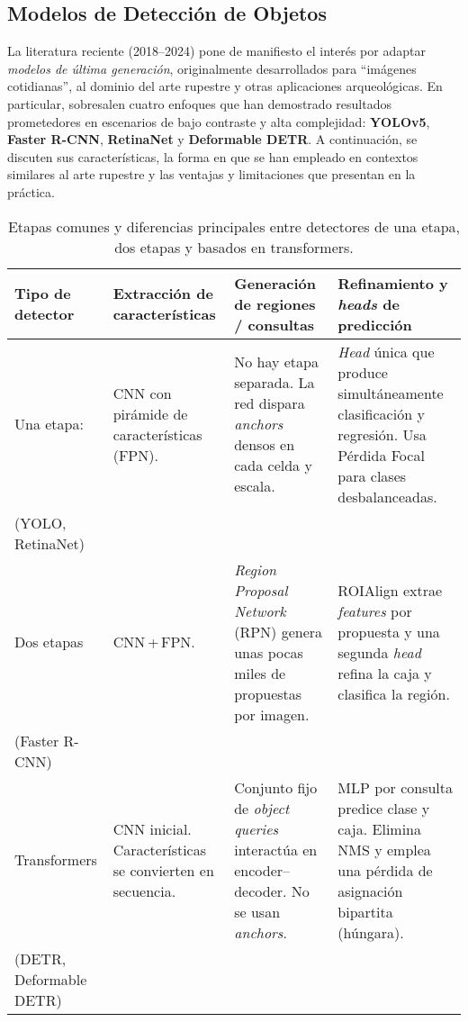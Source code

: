 \subsection{Modelos de Detección de Objetos}

La literatura reciente (2018–2024) pone de manifiesto el interés por adaptar \emph{modelos de última generación}, originalmente desarrollados para “imágenes cotidianas”, al dominio del arte rupestre y otras aplicaciones arqueológicas.
En particular, sobresalen cuatro enfoques que han demostrado resultados prometedores en escenarios de bajo contraste y alta complejidad: \textbf{YOLOv5}, \textbf{Faster R-CNN}, \textbf{RetinaNet} y \textbf{Deformable DETR}.
A continuación, se discuten sus características, la forma en que se han empleado en contextos similares al arte rupestre y las ventajas y limitaciones que presentan en la práctica.

\begin{table}[!h]
\centering
\caption{Etapas comunes y diferencias principales entre detectores de una etapa, dos etapas y basados en transformers.}
\label{tab:detector_stages}
\renewcommand{\arraystretch}{1.2} %
\begin{tabular}{|p{2.9cm}|p{3.2cm}|p{4.0cm}|p{4.0cm}|}
\hline
\textbf{Tipo de detector} &
\textbf{Extracción de características} &
\textbf{Generación de regiones / consultas} &
\textbf{Refinamiento y \emph{heads} de predicción} \\ \hline
Una etapa: &
CNN con pirámide de características (FPN). &
No hay etapa separada.
La red dispara \emph{anchors} densos en cada celda y escala. &
\emph{Head} única que produce simultáneamente clasificación y regresión.
Usa Pérdida Focal para clases desbalanceadas. \\
(YOLO, RetinaNet) & & & \\ \hline
Dos etapas &
CNN\,+\,FPN. &
\emph{Region Proposal Network} (RPN) genera unas pocas miles de propuestas por imagen. &
ROIAlign extrae \emph{features} por propuesta y una segunda \emph{head} refina la caja y clasifica la región. \\
(Faster R-CNN) & & & \\ \hline
Transformers &
CNN inicial.
Características se convierten en secuencia. &
Conjunto fijo de \emph{object queries} interactúa en encoder–decoder.
No se usan \emph{anchors}. &
MLP por consulta predice clase y caja.
Elimina NMS y emplea una pérdida de asignación bipartita (húngara). \\
(DETR, Deformable DETR) & & & \\ \hline
\end{tabular}
\end{table}

